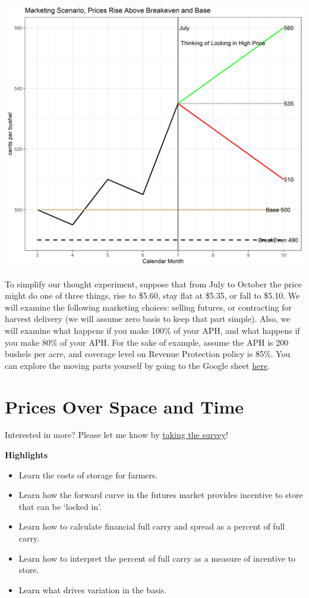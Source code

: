\documentclass[
  letterpaper,
  DIV=11,
  numbers=noendperiod]{scrreprt}
\providecommand{\tightlist}{%
  \setlength{\itemsep}{0pt}\setlength{\parskip}{0pt}}\usepackage{longtable,booktabs,array}
\begin{document}
\includegraphics{assets/cropins_ex.png}

To simplify our thought experiment, suppose that from July to October
the price might do one of three things, rise to \$5.60, stay flat at
\$5.35, or fall to \$5.10. We will examine the following marketing
choices: selling futures, or contracting for harvest delivery (we will
assume zero basis to keep that part simple). Also, we will examine what
happens if you make 100\% of your APH, and what happens if you make 80\%
of your APH. For the sake of example, assume the APH is 200 bushels per
acre, and coverage level on Revenue Protection policy is 85\%. You can
explore the moving parts yourself by going to the Google sheet
\href{https://docs.google.com/spreadsheets/d/1rbne8odUljxIuIYP3IRiWyzaQDs83-mjOkuaaDWxb3w/edit?usp=sharing}{here}.


\hypertarget{prices-over-space-and-time}{%
\chapter{Prices Over Space and Time}\label{prices-over-space-and-time}}

{Interested in more? Please let me know by}
\href{https://forms.gle/Q3VByCQZHjfQSy9D7}{taking the survey}!

\textbf{Highlights}

\begin{itemize}
\tightlist
\item
  Learn the costs of storage for farmers.
\item
  Learn how the forward curve in the futures market provides incentive
  to store that can be `locked in'.
\item
  Learn how to calculate financial full carry and spread as a percent of
  full carry.
\item
  Learn how to interpret the percent of full carry as a measure of
  incentive to store.
\item
  Learn what drives variation in the basis.
\end{itemize}
\end{document}
